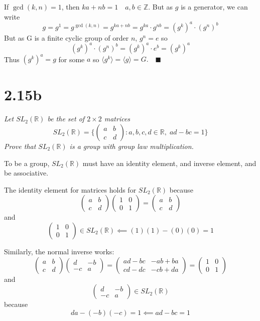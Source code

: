 \documentclass[12pt]{article}
\newcommand{\R}{\mathbb{R}}
\newcommand{\qed}{\quad \blacksquare}
\newcommand{\brak}[1]{\langle #1 \rangle}
\newcommand{\Z}{\mathbb{Z}}
\begin{document}
\color{blue}
If $\gcd(k, n) = 1$, then $ka + nb = 1 \quad a, b \in \Z$. But as $g$ is a generator, we can write
\[g = g^1 = g^{\gcd(k,n)} = g^{ka+nb} = g^{ka} \cdot g^{nb} = (g^k)^a \cdot (g^n)^b\]
But as G is a finite cyclic group of order $n$, $g^n = e$ so
\[(g^k)^a \cdot (g^n)^b = (g^k)^a \cdot e^b = (g^k)^a\]
Thus $(g^k)^a = g$ for some $a$ so $\brak{g^k} = \brak{g} = G. \qed$
\color{black}
\pagebreak

\section*{2.15b} 
\emph{Let $SL_2(\R)$ be the set of $2\times 2$ matrices}
\[SL_2(\R) = \{\begin{pmatrix}
    a & b\\
    c & d
\end{pmatrix}: a, b, c,d \in \R, \; ad-bc = 1\}\]
\emph{Prove that $SL_2(\R)$ is a group with group law multiplication.}

\color{blue}
To be a group, $SL_2(\R)$ must have an identity element, and inverse element, and be associative. 

The identity element for matrices holds for $SL_2(\R)$ because
\[\begin{pmatrix}
    a & b\\
    c & d
\end{pmatrix} \begin{pmatrix}
    1 & 0\\
    0 & 1
\end{pmatrix} = \begin{pmatrix}
    a & b\\
    c & d
\end{pmatrix}\]
and 
\[\begin{pmatrix}
    1 & 0\\
    0 & 1
\end{pmatrix} \in SL_2(\R) \impliedby (1)(1) - (0)(0) = 1\]

Similarly, the normal inverse works:
\[\begin{pmatrix}
    a & b\\
    c & d
\end{pmatrix} \begin{pmatrix}
    d & -b\\
    -c & a
\end{pmatrix} = \begin{pmatrix}
    ad - bc & -ab + ba\\
    cd - dc & -cb + da
\end{pmatrix} = \begin{pmatrix}
    1 & 0\\
    0 & 1
\end{pmatrix}\] 
and 
\[\begin{pmatrix}
    d & -b\\
    -c & a
\end{pmatrix} \in SL_2(\R)\]
because 
\[da - (-b)(-c) = 1 \impliedby ad-bc = 1\]
\end{document}
